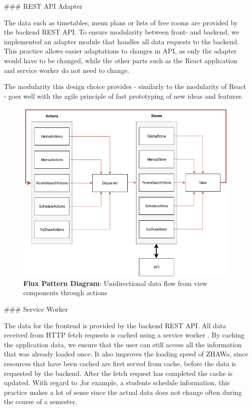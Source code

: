 \begin{markdown}
### REST API Adapter

The data such as timetables, menu plans or lists of free rooms are provided by the backend REST API. To ensure modularity between front- and backend, we implemented an adapter module that handles all data requests to the backend. This practice allows easier adaptations to changes in API, as only the adapter would have to be changed, while the other parts such as the React application and service worker do not need to change.

The modularity this design choice provides - similarly to the modularity of React - goes well with the agile principle of fast prototyping of new ideas and features.

\bigskip

\begin{figure}[H]
  \includegraphics[width=14cm, center]{../../diagrams/flux.png}
  \captionsetup{width=13.5cm}
  \caption[Flux Pattern Diagram]{\textbf{Flux Pattern Diagram}: Unidirectional data flow from view components through actions }
\end{figure}

\bigskip

### Service Worker

The data for the frontend is provided by the backend REST API. All data received from HTTP fetch requests is cached using a service worker \cite{ServiceWorker}. By caching the application data, we ensure that the user can still access all the information that was already loaded once. It also improves the loading speed of ZHAWo, since resources that have been cached are first served from cache, before the data is requested by the backend. After the fetch request has completed the cache is updated. With regard to ,for example, a students schedule information, this practice makes a lot of sense since the actual data does not change often during the course of a semester.


\end{markdown}
